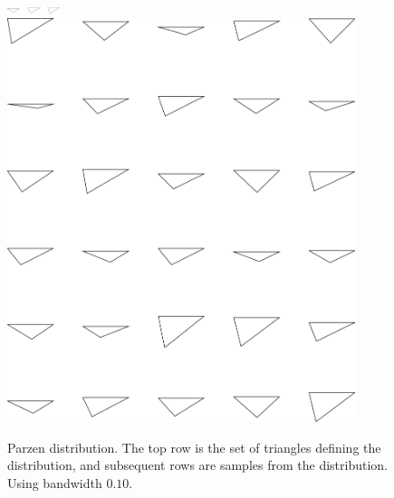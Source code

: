\begin{figure}
\includegraphics[width=0.6in]{output/1.models/test_parzen/parzen_true.png}\\ 
\includegraphics[width=4in]{output/1.models/test_parzen/parzen_0.10_samples.png}\\ 
\caption{Parzen distribution. The top row is the set of triangles
  defining the distribution, and subsequent rows are samples from the
  distribution. Using bandwidth $0.10$. }
\label{fig-parzen-3}
\end{figure}

